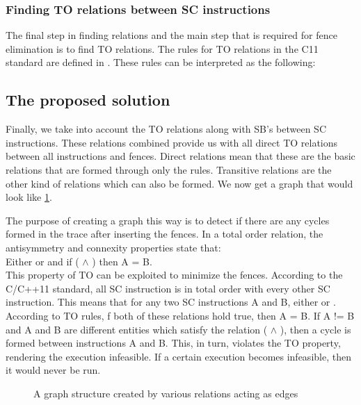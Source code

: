 \subsubsection{Finding TO relations between SC instructions}
The final step in finding relations and the main step that is required for fence elimination is to find TO relations. The rules for TO relations in the C11 standard are defined in . These rules can be interpreted as the following:


\subsection{The proposed solution}
Finally, we take into account the TO relations along with SB's between SC instructions. These relations combined provide us with all direct TO relations between all instructions and fences. Direct relations mean that these are the basic relations that are formed through only the rules. Transitive relations are the other kind of relations which can also be formed. We now get a graph that would look like \ref{fig:cycles}.

\par
The purpose of creating a graph this way is to detect if there are any cycles formed in the trace after inserting the fences. In a total order relation, the antisymmetry and connexity properties state that:\\
Either  or  and if ( $\land$ ) then A = B.\\
This property of TO can be exploited to minimize the fences. According to the C/C++11 standard, all SC instruction is in total order with every other SC instruction. This means that for any two SC instructions A and B, either  or . According to TO rules, f both of these relations hold true, then A = B. If A != B and A and B are different entities which satisfy the relation ( $\land$ ), then a cycle is formed between instructions A and B. This, in turn, violates the TO property, rendering the execution infeasible. If a certain execution becomes infeasible, then it would never be run. 

\begin{figure}
\begin{center}
	
	\caption{A graph structure created by various relations acting as edges}
	\label{fig:cycles}
\end{center}
\end{figure}

